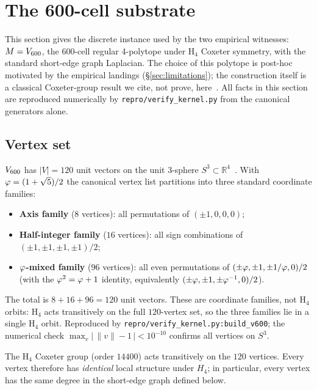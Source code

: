 \section{The 600-cell substrate}\label{sec:substrate}

This section gives the discrete instance used by the two empirical
witnesses: $M = V_{600}$, the 600-cell regular 4-polytope
under H$_4$ Coxeter symmetry, with the standard short-edge graph
Laplacian. The choice of this polytope is post-hoc motivated by
the empirical landings (\S\ref{sec:limitations}); the
construction itself is a classical Coxeter-group result we cite,
not prove, here~\citep{CoxeterRegularPolytopes}. All facts in
this section are reproduced numerically by
\texttt{repro/verify\_kernel.py} from the canonical generators
alone.

\subsection{Vertex set}\label{ssec:vertices}

$V_{600}$ has $|V|=120$ unit vectors on the unit $3$-sphere
$S^{3} \subset \mathbb{R}^{4}$~\citep{CoxeterRegularPolytopes,
Weisstein600Cell}. With $\varphi = (1+\sqrt{5})/2$ the canonical vertex
list partitions into three standard coordinate families:
\begin{itemize}\itemsep=2pt
\item \textbf{Axis family} ($8$ vertices): all permutations of
  $(\pm 1, 0, 0, 0)$;
\item \textbf{Half-integer family} ($16$ vertices): all sign
  combinations of $(\pm 1, \pm 1, \pm 1, \pm 1)/2$;
\item \textbf{$\varphi$-mixed family} ($96$ vertices): all even
  permutations of $(\pm \varphi, \pm 1, \pm 1/\varphi, 0)/2$ (with the
  $\varphi^{2} = \varphi + 1$ identity, equivalently
  $(\pm \varphi, \pm 1, \pm \varphi^{-1}, 0)/2$).
\end{itemize}
The total is $8 + 16 + 96 = 120$ unit vectors. These are coordinate
families, not H$_4$ orbits: H$_4$ acts transitively on the full
$120$-vertex set, so the three families lie in a single H$_4$
orbit. Reproduced by \texttt{repro/verify\_kernel.py:build\_v600};
the numerical check $\max_{v} |\,\|v\| - 1\,| < 10^{-10}$ confirms
all vertices on $S^{3}$.

The H$_4$ Coxeter group (order $14400$) acts transitively on the
$120$ vertices. Every vertex therefore has \emph{identical} local
structure under $H_{4}$; in particular, every vertex has the same
degree in the short-edge graph defined below.

